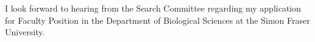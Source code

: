 \documentclass[11pt,letterpaper,roman]{moderncv}
\begin{document}



I look forward to hearing from the Search Committee regarding my application for Faculty Position in the Department of Biological Sciences at the Simon Fraser University.
\vspace{0.1pc}

\makeletterclosingsigned
\vfill%
\\%
\\%
\\%
\\%
\end{document}
